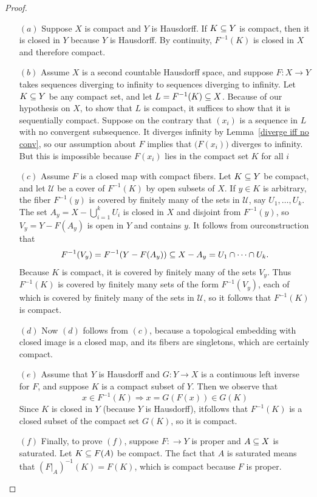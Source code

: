 \begin{proof}
\mbox{}
\begin{itemize}
\item[$(a)$]Suppose $X$ is compact and $Y$ is Hausdorff. If $K\subseteq Y$ is
compact, then it is closed in $Y$ because $Y$ is Hausdorff. By continuity, $F^{-1}(K)$ is
closed in $X$ and therefore compact.
\item[$(b)$]Assume $X$ is a second countable Hausdorff space, and suppose
$F:X\to Y$ takes sequences diverging to infinity to sequences diverging to infinity. Let $K\subseteq Y$ be any compact set, and let $L=F^{-1}(K)\subseteq X$. Because of our hypothesis on $X$, to show that $L$ is compact, it suffices to show that it is sequentially compact. Suppose on the contrary that $(x_i)$ is a sequence in $L$ with no convergent subsequence. It diverges infinity by Lemma~\ref{diverge iff no conv}, so our assumption about $F$ implies that $\big(F(x_i)\big)$ diverges to infinity. But this is impossible because $F(x_i)$ lies in the compact set $K$ for all $i$
\item[$(c)$]Assume $F$ is a closed map with compact fibers. Let $K\subseteq Y$ be compact, and let $\mathcal{U}$ be a cover of $F^{-1}(K)$ by open subsets of $X$. If $y\in K$ is arbitrary, the fiber $F^{-1}(y)$ is covered by finitely many of the sets in $\mathcal{U}$, say $U_1,\dots,U_k$. The set $A_y=X-\bigcup_{i=1}^{k}U_i$ is closed in $X$ and disjoint from $F^{-1}(y)$, so $V_y=Y-F(A_y)$ is open in $Y$ and contains $y$. It follows from ourconstruction that 
\[F^{-1}(V_y)=F^{-1}(Y-F(A_y))\subseteq X-A_y=U_1\cap\cdots\cap U_k.\] 
Because $K$ is compact, it is covered by finitely many of the sets $V_y$. Thus $F^{-1}(K)$ is covered by finitely many sets of the form $F^{-1}(V_y)$, each of which is covered by finitely many of the sets in $\mathcal{U}$, so it follows that $F^{-1}(K)$ is compact.
\item[$(d)$]Now $(d)$ follows from $(c)$, because a topological embedding with closed image is
a closed map, and its fibers are singletons, which are certainly compact.
\item[$(e)$]Assume that $Y$ is Hausdorff and $G:Y\to X$ is a continuous left inverse for $F$, and suppose $K$ is a compact subset of $Y$. Then we observe that
\[x\in F^{-1}(K)\Rightarrow x=G(F(x))\in G(K)\] 
Since $K$ is closed in $Y$ (because $Y$ is Hausdorff), itfollows that $F^{-1}(K)$ is a closed subset of the compact set $G(K)$, so it is compact.
\item[$(f)$]Finally, to prove $(f)$, suppose $F:\to Y$ is proper and $A\subseteq X$ is saturated. Let
$K\subseteq F(A)$ be compact. The fact that $A$ is saturated means that $(F|_A)^{-1}(K)=F(K)$, which is compact because $F$ is proper.
\end{itemize}
\end{proof}
